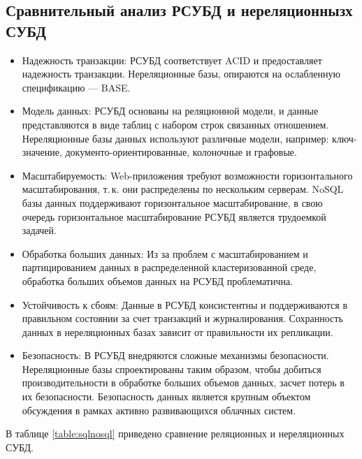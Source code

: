 \subsection{Сравнительный анализ РСУБД и нереляционнызх СУБД}
\begin{itemize}[label=---]
    \item Надежность транзакции: РСУБД соответствует ACID и предоставляет надежность транзакции.
    Нереляционные базы, опираются на ослабленную спецификацию --- BASE.
    \item Модель данных: РСУБД основаны на реляционной модели, и данные представляются в виде таблиц с набором строк связанных отношением.
    Нереляционные базы данных используют различные модели, например: ключ-значение, документо-ориентированные, колоночные и графовые.
    \item Масштабируемость: Web-приложения требуют возможности горизонтального масштабирования, т.\,к. они распределены по нескольким серверам.
    NoSQL базы данных поддерживают горизонтальное масштабирование, в свою очередь горизонтальное масштабирование РСУБД является трудоемкой задачей.
    \item Обработка больших данных: Из за проблем с масштабированием и партицированием данных в распределенной кластеризованной среде, обработка больших объемов данных на РСУБД проблематична.
    \item Устойчивость к сбоям: Данные в РСУБД консистентны и поддерживаются в правильном состоянии за счет транзакций и журналирования.
    Сохранность данных в нереляционных базах зависит от правильности их репликации.
    \item Безопасность: В РСУБД внедряются сложные механизмы безопасности.
    Нереляционные базы спроектированы таким образом, чтобы добиться производительности в обработке больших объемов данных, засчет потерь в их безопасности.
    Безопасность данных является крупным объектом обсуждения в рамках активно развивающихся облачных систем.
\end{itemize}

\clearpage

В таблице \ref{table:sqlnosql} приведено сравнение реляционных и нереляционных СУБД.


